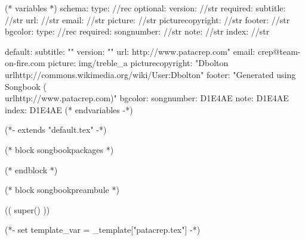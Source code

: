 
(* variables *)
schema:
  type: //rec
  optional:
    version: //str
  required:
    subtitle: //str
    url: //str
    email: //str
    picture: //str
    picturecopyright: //str
    footer: //str
    bgcolor:
      type: //rec
      required:
        songnumber: //str
        note: //str
        index: //str

default:
  subtitle: ""
  version: ""
  url: http://www.patacrep.com"
  email: crep@team-on-fire.com
  picture: img/treble_a
  picturecopyright: "Dbolton \\url{http://commons.wikimedia.org/wiki/User:Dbolton}"
  footer: "Generated using Songbook (\\url{http://www.patacrep.com})"
  bgcolor:
    songnumber: D1E4AE
    note: D1E4AE
    index: D1E4AE
(* endvariables -*)

(*- extends "default.tex" -*)

(* block songbookpackages *)
\usepackage[
    (* for option in bookoptions *)((option)),
    (* endfor *)
    ]{crepbook}
(* endblock *)

(* block songbookpreambule *)
\usepackage[
     a4paper %
     ,includeheadfoot %
     ,hmarginratio=1:1 %
     ,outer=1.8cm %
     ,vmarginratio=1:1 %
     ,bmargin=1.3cm %
     ]{geometry}

(( super() ))

\pagestyle{empty}

(*- set template_var = _template["patacrep.tex"] -*)

